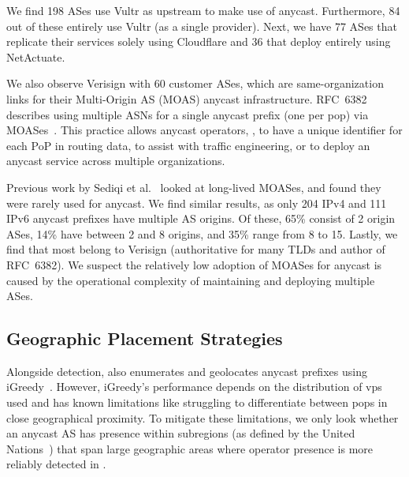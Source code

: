We find \num{198} ASes use Vultr as upstream to make use of anycast.
Furthermore, \num{84} out of these entirely use Vultr (as a single provider).  
%
Next, we have \num{77} ASes that replicate their services solely using Cloudflare and \num{36} that deploy entirely using NetActuate.

We also observe Verisign with \num{60} customer ASes,
which are
same-organization links for their Multi-Origin AS (MOAS) anycast infrastructure.
%
RFC~6382 describes using multiple ASNs for a single anycast prefix (one per \gls{pop})
via MOASes~\cite{rfc6382}.
%
This practice allows anycast operators,
\eg, to have a unique identifier for each PoP in routing data,
to assist with traffic engineering,
or to deploy an anycast service across multiple organizations.

Previous work by Sediqi et al.~\cite{moas-study} looked at long-lived MOASes, and found
they were rarely used for anycast.
%
We find similar results, as only \num{204} IPv4 and \num{111} IPv6 anycast prefixes have multiple AS origins.
%
Of these, 65\% consist of 2 origin ASes, 14\% have between 2 and 8 origins, and 35\% range from 8 to 15.
%
Lastly, we find that
most belong to Verisign (authoritative for many TLDs and author of RFC~6382).
%
We suspect the relatively low adoption of MOASes for anycast
is caused by the operational complexity of maintaining and deploying multiple ASes.

\subsection{Geographic Placement Strategies}\label{subsec:geographic-distribution}
Alongside detection, \laces also enumerates and geolocates anycast prefixes using iGreedy~\cite{igreedy}.
However, iGreedy's performance depends on the distribution of \glspl{vp} used
and has known limitations like struggling to differentiate between \glspl{pop} in close geographical proximity.
%
To mitigate these limitations, we only look whether an anycast AS has presence
within subregions (as defined by the United Nations~\cite{un_geoscheme})
that span large geographic areas where operator presence is more reliably detected in \laces.


